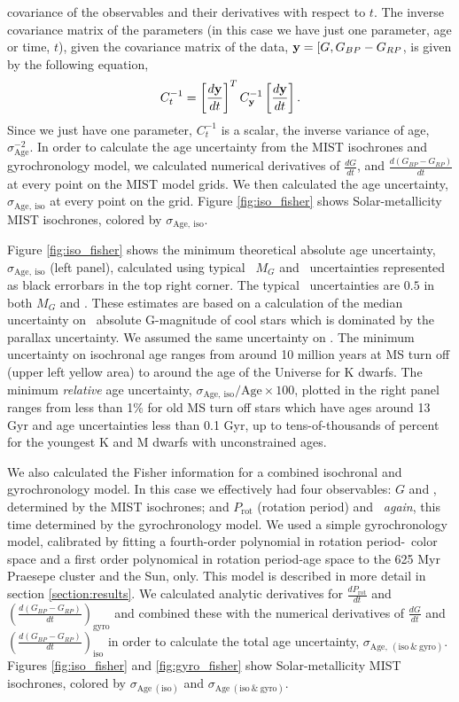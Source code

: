 covariance of the observables and their derivatives with respect to $t$.
The inverse covariance matrix of the parameters (in this case we have just one
parameter, age or time, $t$), given the covariance matrix of the data, ${\bf y}
= [G, G_{BP} - G_{RP}$, is given by the following equation,
\begin{equation}
    C_{t}^{-1} = \left[\frac{d{\bf y}}{dt}\right]^T
    C_{\bf y}^{-1} \left[\frac{d{\bf y}}{dt}\right].
\end{equation}
Since we just have one parameter, $C_t^{-1}$ is a scalar, the inverse variance
of age, $\sigma_{\mathrm{Age}}^{-2}$.
In order to calculate the age uncertainty from the MIST isochrones and
gyrochronology model, we calculated numerical derivatives of $\frac{dG}{dt}$,
and $\frac{d(G_{BP} - G_{RP})}{dt}$ at every point on the MIST model grids.
We then calculated the age uncertainty, $\sigma_{\mathrm{Age,~iso}}$ at every
point on the grid.
Figure \ref{fig:iso_fisher} shows Solar-metallicity MIST isochrones, colored
by $\sigma_{\mathrm{Age,~iso}}$.

Figure \ref{fig:iso_fisher} shows the minimum theoretical absolute age
uncertainty, $\sigma_{\mathrm{Age,~iso}}$ (left panel), calculated using
typical \Gaia\ $M_G$ and \gcolor\ uncertainties represented as black errorbars
in the top right corner.
The typical \Gaia\ uncertainties are $0.5$ in both $M_G$ and \gcolor.
These estimates are based on a calculation of the median uncertainty on \Gaia\
absolute G-magnitude of cool stars which is dominated by the parallax
uncertainty.
We assumed the same uncertainty on \gcolor.
The minimum uncertainty on isochronal age ranges from around 10 million years
at MS turn off (upper left yellow area) to around the age of the Universe for
K dwarfs.
The minimum {\it relative} age uncertainty,
$\sigma_{\mathrm{Age,~iso}}/\mathrm{Age} \times 100$, plotted in the right
panel ranges from less than 1\% for old MS turn off stars which have ages
around 13 Gyr and age uncertainties less than 0.1 Gyr, up to tens-of-thousands
of percent for the youngest K and M dwarfs with unconstrained ages.

We also calculated the Fisher information for a combined isochronal and
gyrochronology model.
In this case we effectively had four observables: $G$ and \gcolor, determined
by the MIST isochrones; and $P_{\mathrm{rot}}$ (rotation period) and \gcolor\
{\it again}, this time determined by the gyrochronology model.
We used a simple gyrochronology model, calibrated by fitting a fourth-order
polynomial in rotation period-\Gaia\ color space and a first order polynomical
in rotation period-age space to the 625 Myr Praesepe cluster and the Sun,
only.
This model is described in more detail in section \ref{section:results}.
We calculated analytic derivatives for $\frac{dP_{\mathrm{rot}}}{dt}$ and
$\left(\frac{d(G_{BP} - G_{RP})}{dt}\right)_{\mathrm{gyro}}$ and combined
these with the numerical derivatives of $\frac{dG}{dt}$ and
$\left(\frac{d(G_{BP} - G_{RP})}{dt}\right)_{\mathrm{iso}}$ in order to
calculate the total age uncertainty, $\sigma_{\mathrm{Age,~(iso~\&~gyro)}}$.
Figures \ref{fig:iso_fisher} and \ref{fig:gyro_fisher} show Solar-metallicity
MIST isochrones, colored by $\sigma_{\mathrm{Age~(iso)}}$ and
$\sigma_{\mathrm{Age~(iso~\&~gyro)}}$.

